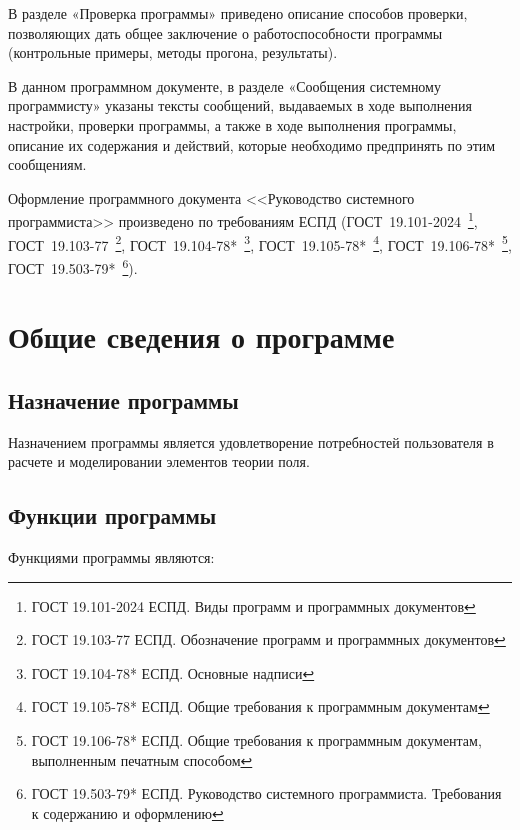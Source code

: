 \documentclass[14pt,a4paper,final]{extreport}
\begin{document}
В разделе «Проверка программы» приведено описание способов проверки,
позволяющих дать общее заключение о работоспособности программы
(контрольные примеры, методы прогона, результаты).

В данном программном документе, в разделе «Сообщения системному программисту» указаны тексты сообщений, выдаваемых в ходе выполнения настройки, проверки программы, а также в ходе выполнения программы, описание их содержания и действий, которые необходимо предпринять по этим сообщениям.

Оформление программного документа <<Руководство системного программиста>> произведено по требованиям ЕСПД (ГОСТ~19.101-2024~\footnote{ГОСТ 19.101-2024 ЕСПД. Виды программ и программных документов}, 
ГОСТ~19.103-77~\footnote{ГОСТ 19.103-77 ЕСПД. Обозначение программ и программных документов}, 
ГОСТ~19.104-78*~\footnote{ГОСТ 19.104-78* ЕСПД. Основные надписи}, 
ГОСТ~19.105-78*~\footnote{ГОСТ 19.105-78* ЕСПД. Общие требования к программным документам},
ГОСТ~19.106-78*~\footnote{ГОСТ 19.106-78* ЕСПД. Общие требования к программным документам, выполненным печатным способом},
ГОСТ~19.503-79*~\footnote{ГОСТ 19.503-79* ЕСПД. Руководство системного программиста. Требования к содержанию и оформлению}).

\pagebreak


\tableofcontents



\pagebreak

\chapter{Общие сведения о программе}

\section{Назначение программы}

Назначением программы является удовлетворение потребностей пользователя в расчете и моделировании элементов теории поля.

\section{Функции программы}

Функциями программы являются:
\end{document}
